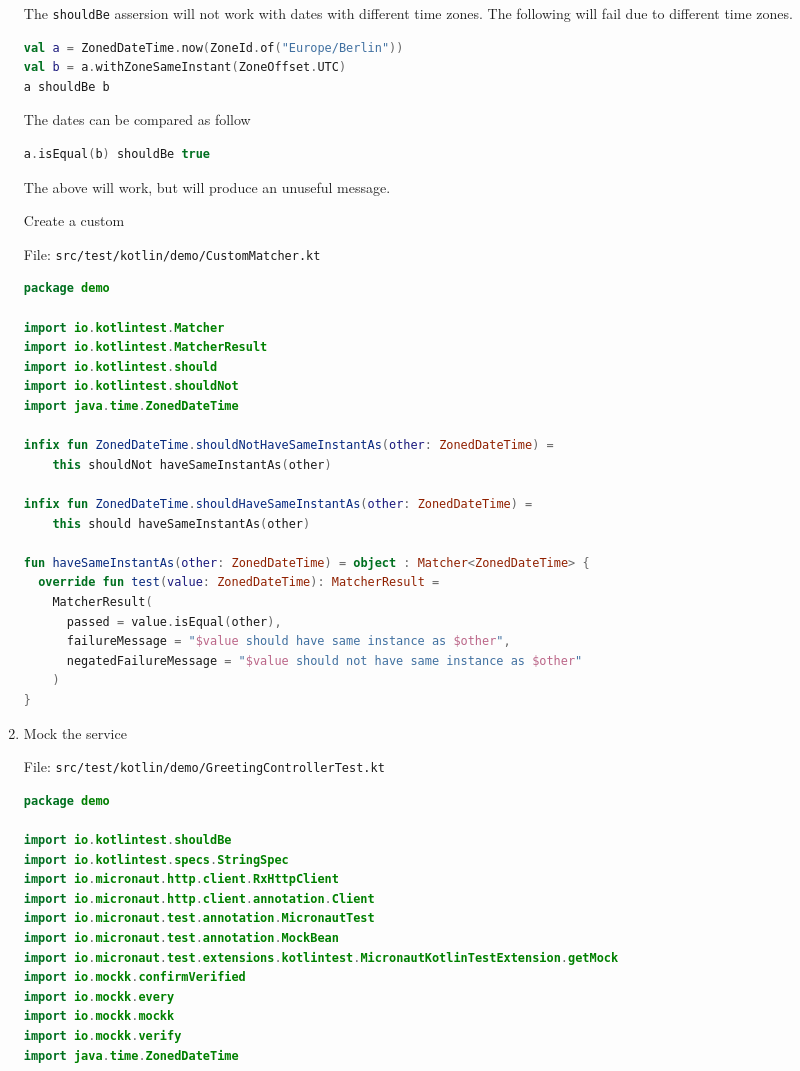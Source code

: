 \begin{enumerate}
The \texttt{shouldBe} assersion will not work with dates with different time zones.  The following will fail due to different time zones.

\begin{lstlisting}[language=Kotlin]
val a = ZonedDateTime.now(ZoneId.of("Europe/Berlin"))
val b = a.withZoneSameInstant(ZoneOffset.UTC)
a shouldBe b
\end{lstlisting}

The dates can be compared as follow

\begin{lstlisting}[language=Kotlin]
a.isEqual(b) shouldBe true
\end{lstlisting}

The above will work, but will produce an unuseful message.

Create a custom

File: \texttt{src/test/kotlin/demo/CustomMatcher.kt}
\begin{lstlisting}[language=Kotlin]
package demo

import io.kotlintest.Matcher
import io.kotlintest.MatcherResult
import io.kotlintest.should
import io.kotlintest.shouldNot
import java.time.ZonedDateTime

infix fun ZonedDateTime.shouldNotHaveSameInstantAs(other: ZonedDateTime) =
    this shouldNot haveSameInstantAs(other)

infix fun ZonedDateTime.shouldHaveSameInstantAs(other: ZonedDateTime) =
    this should haveSameInstantAs(other)

fun haveSameInstantAs(other: ZonedDateTime) = object : Matcher<ZonedDateTime> {
  override fun test(value: ZonedDateTime): MatcherResult =
    MatcherResult(
      passed = value.isEqual(other),
      failureMessage = "$value should have same instance as $other",
      negatedFailureMessage = "$value should not have same instance as $other"
    )
}
\end{lstlisting}


\item Mock the service

File: \texttt{src/test/kotlin/demo/GreetingControllerTest.kt}
\begin{lstlisting}[language=Kotlin]
package demo

import io.kotlintest.shouldBe
import io.kotlintest.specs.StringSpec
import io.micronaut.http.client.RxHttpClient
import io.micronaut.http.client.annotation.Client
import io.micronaut.test.annotation.MicronautTest
import io.micronaut.test.annotation.MockBean
import io.micronaut.test.extensions.kotlintest.MicronautKotlinTestExtension.getMock
import io.mockk.confirmVerified
import io.mockk.every
import io.mockk.mockk
import io.mockk.verify
import java.time.ZonedDateTime


\end{lstlisting}
\end{enumerate}
